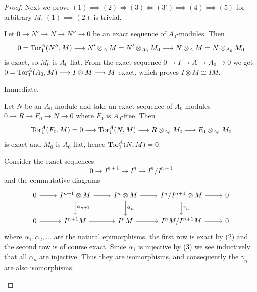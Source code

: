 \documentclass[../main]{subfiles}
\begin{document}
\begin{proof}
Next we prove $(1)\implies (2)\iff (3)\iff (3') \implies (4) \implies (5)$ for arbitrary $M$. $(1)\implies (2)$ is trivial.
\begin{implyenumerate}
    \item[$(2)\implies (3)$]Let $0\longrightarrow N' \longrightarrow N \longrightarrow N'' \longrightarrow 0$ be an exact sequence of $A_0$-modules. Then \[0 = \operatorname{Tor}_1^A(N'',M) \longrightarrow N' \otimes_A M = N' \otimes_{A_0} M_0\longrightarrow N\otimes_A M = N\otimes_{A_0} M_0 \] is exact, so $M_0$ is $A_0$-flat. From the exact sequence $0\longrightarrow I\longrightarrow A\longrightarrow A_0\longrightarrow 0$ we get $0 = \operatorname{Tor}_1^A(A_0,M)\longrightarrow I\otimes M\longrightarrow M$ exact, which proves $I\otimes M\cong IM$.
    \item[$(3)\implies (3')$] Immediate.
    \item[$(3')\implies (2)$] Let $N$ be an $A_0$-module and take an exact sequence of $A_0$-modules $0\longrightarrow R\longrightarrow F_0\longrightarrow N\longrightarrow 0$ where $F_0$ is $A_0$-free. Then \[\operatorname{Tor}_1^A(F_0,M) = 0 \longrightarrow \operatorname{Tor}_1^A(N,M)\longrightarrow R\otimes_{A_0} M_0\longrightarrow F_0\otimes_{A_0} M_0\] is exact and $M_0$ is $A_0$-flat, hence $\operatorname{Tor}_1^A(N,M) = 0$.
    \item[$(2)\implies (4)$] Consider the exact sequences \[0\longrightarrow I^{n+1}\longrightarrow I^n\longrightarrow I^n/I^{n+1}\] and the commutative diagrams \[\begin{tikzcd}
	0 & {I^{n+1}\otimes M} & {I^n\otimes M} & {I^n/I^{n+1}\otimes M} & 0 \\
	0 & {I^{n+1} M} & {I^n M} & {I^nM/I^{n+1}M} & 0
	\arrow[from=1-1, to=1-2]
	\arrow[from=1-2, to=1-3]
	\arrow[from=1-3, to=1-4]
	\arrow[from=1-4, to=1-5]
	\arrow["{\alpha_{n+1}}", from=1-2, to=2-2]
	\arrow["{\alpha_n}", from=1-3, to=2-3]
	\arrow["{\gamma_n}", from=1-4, to=2-4]
	\arrow[from=2-1, to=2-2]
	\arrow[from=2-2, to=2-3]
	\arrow[from=2-3, to=2-4]
	\arrow[from=2-4, to=2-5]
    \end{tikzcd}\] where $\alpha_1,\alpha_2,\dots$ are the natural epimorphisms, the first row is exact by (2) and the second row is of course exact. Since $\alpha_1$ is injective by (3) we see inductively that all $\alpha_n$ are injective. Thus they are isomorphisms, and consequently the $\gamma_n$ are also isomorphisms.
\end{implyenumerate}


\end{proof}
\end{document}
